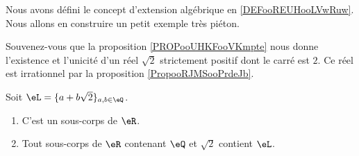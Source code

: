 \begin{normaltext}
	Nous avons défini le concept d'extension algébrique en \ref{DEFooREUHooLVwRuw}. Nous allons en construire un petit exemple très piéton.

	Souvenez-vous que la proposition \ref{PROPooUHKFooVKmpte} nous donne l'existence et l'unicité d'un réel \( \sqrt{ 2 }\) strictement positif dont le carré est \( 2\). Ce réel est irrationnel par la proposition \ref{PropooRJMSooPrdeJb}.
\end{normaltext}

\begin{proposition}
	Soit \( \eL=\{ a+b\sqrt{ 2 } \}_{a,b\in \eQ}\).
	\begin{enumerate}
		\item
		      C'est un sous-corps de \( \eR\).
		\item   \label{ITEMooUSOAooZoBhla}
		      Tout sous-corps de \( \eR\) contenant \( \eQ\) et \( \sqrt{ 2 }\) contient \( \eL\).
	\end{enumerate}
\end{proposition}

